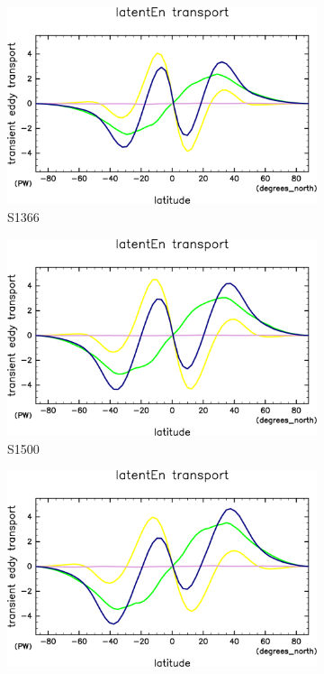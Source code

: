 \documentclass[body]{subfiles}
\begin{document}
\begin{figure}[t]
	\centering
	\begin{subfigure}{.4\textwidth}
		\centering
		\includegraphics[width=\columnwidth]{S1366/MeriHeatTrans@latentEn,time=14600:14965-crop-rotate.pdf}
		\caption{S1366}\label{潜熱S1366}
	\end{subfigure}
	\begin{subfigure}{.4\textwidth}
		\centering
		\includegraphics[width=\columnwidth]{S1500/MeriHeatTrans@latentEn,time=3650:4015-crop-rotate.pdf}
		\caption{S1500}\label{潜熱S1500}
	\end{subfigure}
	\begin{subfigure}{.4\textwidth}
		\centering
		\includegraphics[width=\columnwidth]{S1600/MeriHeatTrans@latentEn,time=3650:4015-crop-rotate.pdf}

\end{subfigure}
\end{figure}
\end{document}
